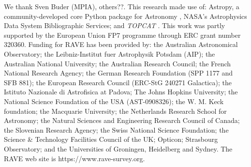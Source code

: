 \documentclass[preprint2,trackchanges]{aastex}
\newcommand{\project}[1]{\textsl{#1}}
\begin{document}
\acknowledgements
We thank Sven Buder (MPIA), others??.
This research made use of: Astropy, a community-developed core Python package for
Astronomy \citep{astropy}, NASA's Astrophysics Data System Bibliographic Services;
 and \project{TOPCAT} \citep{Taylor2005}.
This work was partly supported by the European Union FP7 programme through ERC 
grant number 320360.
Funding for RAVE has been provided by: the Australian Astronomical Observatory; the Leibniz-Institut fuer Astrophysik Potsdam (AIP); the Australian National University; the Australian Research Council; the French National Research Agency; the German Research Foundation (SPP 1177 and SFB 881); the European Research Council (ERC-StG 240271 Galactica); the Istituto Nazionale di Astrofisica at Padova; The Johns Hopkins University; the National Science Foundation of the USA (AST-0908326); the W. M. Keck foundation; the Macquarie University; the Netherlands Research School for Astronomy; the Natural Sciences and Engineering Research Council of Canada; the Slovenian Research Agency; the Swiss National Science Foundation; the Science \& Technology Facilities Council of the UK; Opticon; Strasbourg Observatory; and the Universities of Groningen, Heidelberg and Sydney. The RAVE web site is https://www.rave-survey.org.  
\end{document}
